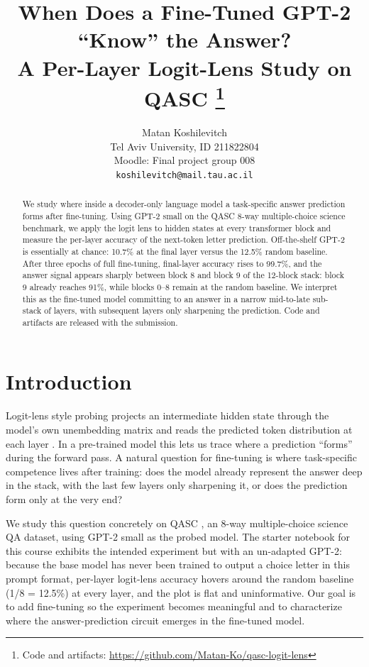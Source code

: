 \documentclass[11pt]{article}
\title{When Does a Fine-Tuned GPT-2 ``Know'' the Answer? \\
  A Per-Layer Logit-Lens Study on QASC
  \thanks{Code and artifacts: \url{https://github.com/Matan-Ko/qasc-logit-lens}}}
\author{
  Matan Koshilevitch \\
  Tel Aviv University, ID 211822804 \\
  Moodle: Final project group 008 \\
  \texttt{koshilevitch@mail.tau.ac.il} \\
}
\begin{document}
\maketitle

\begin{abstract}
We study where inside a decoder-only language model a task-specific answer
prediction forms after fine-tuning. Using GPT-2 small on the QASC 8-way
multiple-choice science benchmark, we apply the logit lens to hidden states
at every transformer block and measure the per-layer accuracy of the next-token
letter prediction. Off-the-shelf GPT-2 is essentially at chance: 10.7\% at the
final layer versus the 12.5\% random baseline. After three epochs of full
fine-tuning, final-layer accuracy rises to 99.7\%, and the answer signal
appears sharply between block 8 and block 9 of the 12-block stack: block 9
already reaches 91\%, while blocks 0--8 remain at the random baseline. We
interpret this as the fine-tuned model committing to an answer in a narrow
mid-to-late sub-stack of layers, with subsequent layers only sharpening the
prediction. Code and artifacts are released with the submission.
\end{abstract}

\section{Introduction}

Logit-lens style probing projects an intermediate hidden state through the
model's own unembedding matrix and reads the predicted token distribution at
each layer \citep{nostalgebraist2020}. In a pre-trained model this lets us
trace where a prediction ``forms'' during the forward pass. A natural question
for fine-tuning is where task-specific competence lives after training: does
the model already represent the answer deep in the stack, with the last few
layers only sharpening it, or does the prediction form only at the very end?

We study this question concretely on QASC \citep{khot2020qasc}, an 8-way
multiple-choice science QA dataset, using GPT-2 small \citep{radford2019gpt2}
as the probed model. The starter notebook for this course exhibits the
intended experiment but with an un-adapted GPT-2: because the base model has
never been trained to output a choice letter in this prompt format, per-layer
logit-lens accuracy hovers around the random baseline (1/8 = 12.5\%) at every
layer, and the plot is flat and uninformative. Our goal is to add fine-tuning
so the experiment becomes meaningful and to characterize where the
answer-prediction circuit emerges in the fine-tuned model.
\end{document}
